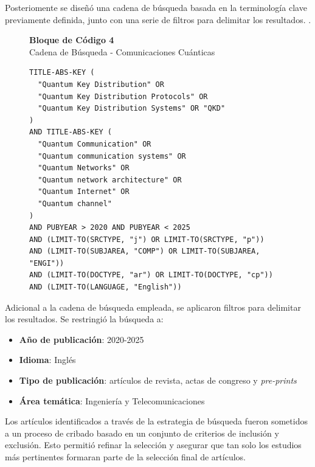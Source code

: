 Posteriomente se diseñó una cadena de búsqueda basada en la terminología clave previamente definida, junto con una serie de filtros para delimitar los resultados. .

\begin{figure}[H]
\centering
\begin{minipage}{0.8\textwidth} %
    \centering
    {\fontsize{12}{11}\selectfont %
    \textbf{Bloque de Código 4} \\ %
     Cadena de Búsqueda - Comunicaciones Cuánticas \\ %
 }
  \begin{verbatim}
TITLE-ABS-KEY (
  "Quantum Key Distribution" OR
  "Quantum Key Distribution Protocols" OR
  "Quantum Key Distribution Systems" OR "QKD"
)
AND TITLE-ABS-KEY (
  "Quantum Communication" OR
  "Quantum communication systems" OR
  "Quantum Networks" OR
  "Quantum network architecture" OR
  "Quantum Internet" OR
  "Quantum channel"
)
AND PUBYEAR > 2020 AND PUBYEAR < 2025
AND (LIMIT-TO(SRCTYPE, "j") OR LIMIT-TO(SRCTYPE, "p"))
AND (LIMIT-TO(SUBJAREA, "COMP") OR LIMIT-TO(SUBJAREA, "ENGI"))
AND (LIMIT-TO(DOCTYPE, "ar") OR LIMIT-TO(DOCTYPE, "cp"))
AND (LIMIT-TO(LANGUAGE, "English"))
   \end{verbatim}
\end{minipage}
\end{figure}

Adicional a la cadena de búsqueda empleada, se aplicaron filtros para
delimitar los resultados. Se restringió la búsqueda a: 
\begin{itemize}
    \item \textbf{Año de publicación}: 2020-2025
    \item \textbf{Idioma}: Inglés
    \item \textbf{Tipo de publicación}: artículos de revista, actas de congreso y \emph{pre-prints}
    \item \textbf{Área temática}: Ingeniería y Telecomunicaciones
\end{itemize}

Los artículos identificados a través de la estrategia de búsqueda fueron sometidos a un proceso de cribado basado en un conjunto de criterios de inclusión y exclusión. Esto permitió refinar la selección y asegurar que tan solo los estudios más pertinentes formaran parte de la selección final de artículos.


